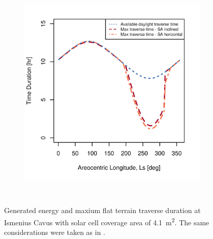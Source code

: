 \begin{figure}[h]
\begin{subfigure}[t]{\subfigureWidth}
        \includegraphics[height=\graphicsHeight]{sections/power-system-design/solar-array/plots/ismeniuscavus-75w-max-traverse-durations-for-solar-cell-coverage-area-41m2.png}
		\label{fig:plot:sub:ismenius-cavus-max-traverse-durations}
	\end{subfigure}\\[0.8ex]
    \caption[Generated energy and maxium flat terrain traverse durations at Ismenius Cavus]
            {Generated energy and maxium flat terrain traverse duration at Ismenius Cavus with solar cell coverage area of \SI{4.1}{m^{2}}. The same considerations were taken as in .}
    \label{fig:plot:ismenius-cavus-generated-energy-and-max-traverse-durations}
\vspace{-2ex}
\end{figure}

